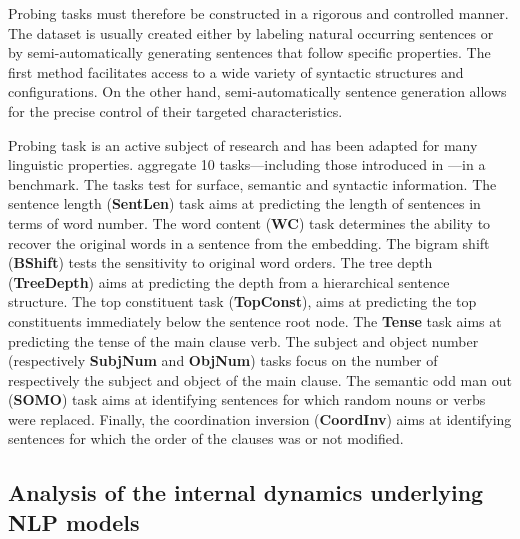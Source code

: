 Probing tasks must therefore be constructed in a rigorous and controlled manner. The dataset is usually created either by labeling natural occurring sentences or by semi-automatically generating sentences that follow specific properties. The first method facilitates access to a wide variety of syntactic structures and configurations. On the other hand, semi-automatically sentence generation allows for the precise control of their targeted characteristics.


Probing task is an active subject of research and has been adapted for many linguistic properties. \textcite{baroni_18} aggregate 10 tasks—including those introduced in \textcite{adi_17}—in a benchmark. The tasks test for surface, semantic and syntactic information. The sentence length (\textbf{SentLen}) task aims at predicting the length of sentences in terms of word number. The word content (\textbf{WC}) task determines the ability to recover the original words in a sentence from the embedding. The bigram shift (\textbf{BShift}) tests the sensitivity to original word orders. The tree depth (\textbf{TreeDepth}) aims at predicting the depth from a hierarchical sentence structure. The top constituent task (\textbf{TopConst}), aims at predicting the top constituents immediately below the sentence root node. The \textbf{Tense} task aims at predicting the tense of the main clause verb. The subject and object number (respectively \textbf{SubjNum} and \textbf{ObjNum}) tasks focus on the number of respectively the subject and object of the main clause. The semantic odd man out (\textbf{SOMO}) task aims at identifying sentences for which random nouns or verbs were replaced. Finally, the coordination inversion (\textbf{CoordInv}) aims at identifying sentences for which the order of the clauses was or not modified.






\subsection{Analysis of the internal dynamics underlying NLP models}

